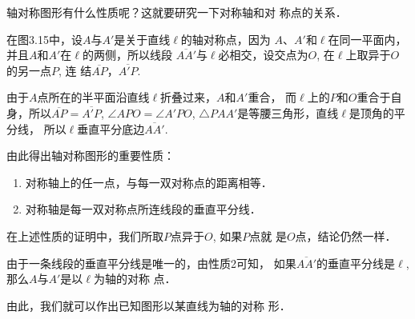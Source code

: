 轴对称图形有什么性质呢？这就要研究一下对称轴和对
称点的关系．

在图3.15中，设$A$与$A'$是关于直线$\ell$的轴对称点，因为
$A$、$A'$和$\ell$在同一平面内，并且$A$和$A'$在$\ell$的两侧，所以线段
$\overline{AA'}$与$\ell$必相交，设交点为$O$, 在$\ell$上取异于$O$的另一点$P$, 连
结$\overline{AP}$，$\overline{A'P}$.

由于$A$点所在的半平面沿直线$\ell$折叠过来，$A$和$A'$重合，
而$\ell$上的$P$和$O$重合于自身，所以$\overline{AP}=\overline{A'P}$, $\angle APO=\angle A'PO$, $\triangle PAA'$是等腰三角形，直线$\ell$是顶角的平分线，
所以$\ell$垂直平分底边$\overline{AA'}$.

由此得出轴对称图形的重要性质：
\begin{enumerate}
\item 对称轴上的任一点，与每一双对称点的距离相等．
\item 对称轴是每一双对称点所连线段的垂直平分线．
\end{enumerate}

在上述性质的证明中，我们所取$P$点异于$O$, 如果$P$点就
是$O$点，结论仍然一样．

由于一条线段的垂直平分线是唯一的，由性质2可知，
如果$\overline{AA'}$的垂直平分线是$\ell$, 那么$A$与$A'$是以$\ell$为轴的对称
点．

由此，我们就可以作出已知图形以某直线为轴的对称
形．

\begin{figure}[htp]\centering
    \begin{minipage}[t]{0.48\textwidth}
    \centering
{}
    \caption{}
    \end{minipage}
    \begin{minipage}[t]{0.48\textwidth}
    \centering
    \caption{}
    \end{minipage}
    \end{figure}



